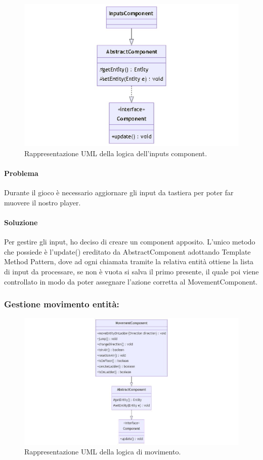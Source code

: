 \documentclass[a4paper,12pt]{report}
\begin{document}
\begin{figure}[H]
\centering{}
\includegraphics[width=\textwidth]{img/inputscomponent.jpg}
\caption{Rappresentazione UML della logica dell'inputs component.}
\end{figure}

\paragraph{Problema} Durante il gioco è necessario aggiornare gli input da tastiera per poter far muovere il nostro player.

\paragraph{Soluzione} Per gestire gli input, ho deciso di creare un component apposito. L’unico metodo che possiede è l’update() ereditato da AbstractComponent adottando Template Method Pattern, dove ad ogni chiamata tramite la relativa entità ottiene la lista di input da processare, se non è vuota si salva il primo presente, il quale poi viene controllato in modo da poter assegnare l’azione corretta al MovementComponent.

\subsubsection{Gestione movimento entità:}

\begin{figure}[H]
\centering{}
\includegraphics[width=\textwidth]{img/movement.jpg}
\caption{Rappresentazione UML della logica di movimento.}
\end{figure}
\end{document}
